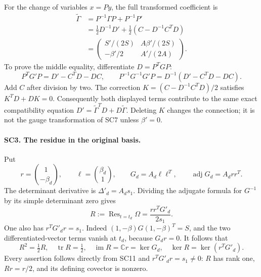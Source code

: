 For the change of variables \(x=Py\), the full transformed
coefficient is
\[
 \begin{split}
 \widetilde\Gamma
 &=P^{-1}\Gamma P+P^{-1}P'\\
 &=\frac12D^{-1}D'+\frac12(C-D^{-1}C^TD)\\
 &=\begin{pmatrix}
       S'/(2S)&A\beta'/(2S)\\
       -\beta'/2&A'/(2A)
    \end{pmatrix}.
 \end{split}\tag{SC9}
\]
To prove the middle equality, differentiate \(D=P^TGP\):
\[
 P^TG'P=D'-C^TD-DC,\qquad
 P^{-1}G^{-1}G'P=D^{-1}(D'-C^TD-DC).
\]
Add \(C\) after division by two. The correction
\(K=(C-D^{-1}C^TD)/2\) satisfies \(K^TD+DK=0\).
Consequently both displayed terms contribute to the same exact
compatibility equation \(D'=\widetilde\Gamma^TD+
D\widetilde\Gamma\). Deleting \(K\) changes the connection; it
is not the gauge transformation of SC7 unless \(\beta'=0\).

\paragraph{SC3. The residue in the original basis.}
Put
\[
 r=\binom{1}{-\beta_d},\qquad
 \ell=\binom{\beta_d}{1},\qquad
 G_d=A_d\ell\ell^T,\qquad
 \operatorname{adj}G_d=A_drr^T .
 \tag{SC10}
\]
The determinant derivative is \(\Delta'_d=A_ds_1\).
Dividing the adjugate formula for \(G^{-1}\) by its simple
determinant zero gives
\[
 R:=\operatorname{Res}_{t=t_d}\Omega
   =\frac{r r^TG'_d}{2s_1}.
 \tag{SC11}
\]
One also has \(r^TG'_dr=s_1\). Indeed
\((1,-\beta)G(1,-\beta)^T=S\), and the two differentiated-vector
terms vanish at \(t_d\), because \(G_dr=0\). It follows that
\[
 R^2=\tfrac12R,\quad
 \operatorname{tr}R=\tfrac12,\quad
 \operatorname{im}R=\mathbb Cr=\ker G_d,\quad
 \ker R=\ker(r^TG'_d).
 \tag{SC12}
\]
Every assertion follows directly from SC11 and
\(r^TG'_dr=s_1\ne0\): \(R\) has rank one, \(Rr=r/2\),
and its defining covector is nonzero.

